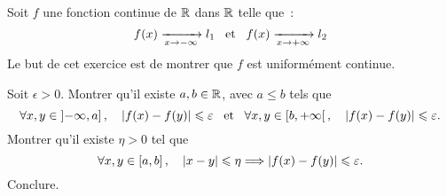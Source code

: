 \documentclass{magnolia}
\begin{document}
Soit $f$ une fonction continue de $\mathbb{R}$ dans $\mathbb{R}$ telle que~:
\[f(x) \xrightarrow[x\rightarrow -\infty]{} l_1 \quad\!\text{et}\quad\! f(x) \xrightarrow[x\rightarrow +\infty]{} l_2\]
Le but de cet exercice est de montrer que $f$ est uniformément continue.
\begin{questions}
\question Soit $\epsilon>0$. Montrer qu'il existe $a,b\in\mathbb{R}$, avec $a\leq b$
  tels que
  \[\forall x,y \in\left]-\infty,a\right] ,\quad \left|f(x)-f(y)\right|\leqslant\varepsilon
    \quad\!\text{et}\quad\!
    \forall x,y \in\left[b,+\infty\right[ ,\quad \left|f(x)-f(y)\right|\leqslant\varepsilon.\]
\question Montrer qu'il existe $\eta>0$ tel que
  \[\forall x,y\in\left[a,b\right] ,\quad \left|x-y\right|\leqslant\eta \Longrightarrow
    \left|f(x)-f(y)\right|\leqslant\varepsilon.\]
\question Conclure.
\end{questions}
\end{document}
